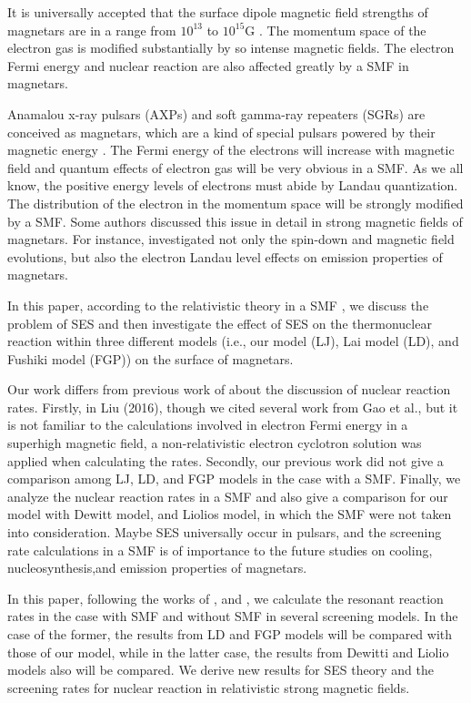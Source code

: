 \documentclass[manuscript]{aastex}
\begin{document}
It is universally accepted that the surface dipole magnetic field
strengths of magnetars are in a range from $10^{13}$ to $10^{15}$G
\citep{Peng07, Gao11, Gao13, Gao15, Gao17a, Gao17b, Li16, Lai01}.
The momentum space of the electron gas is modified substantially by
so intense magnetic fields. The electron Fermi energy and nuclear
reaction are also affected greatly by a SMF in magnetars.

Anamalou x-ray pulsars (AXPs) and soft gamma-ray repeaters (SGRs)
are conceived as magnetars, which are a kind of special pulsars
powered by their magnetic energy \citep{Duncan92}. The Fermi energy
of the electrons will increase with magnetic field and quantum
effects of electron gas will be very obvious in a SMF. As we all
know, the positive energy levels of electrons must abide by Landau
quantization. The distribution of the electron in the momentum space
will be strongly modified by a SMF. Some authors discussed this
issue in detail in strong magnetic fields of magnetars. For
instance, \citet{Gao15, Gao17a, Gao17b} investigated not only the
spin-down and magnetic field evolutions, but also the electron
Landau level effects on emission properties of magnetars.

In this paper, according to the relativistic theory in a SMF
\citep{Peng07, Gao11, Gao13, Gao15, Gao17b}, we discuss the problem
of SES and then investigate the effect of SES on the thermonuclear
reaction within three different models (i.e., our model (LJ), Lai
model (LD)\citep{Lai91, Lai01}, and Fushiki model
(FGP)\citep{Fushiki89}) on the surface of magnetars.


Our work differs from previous work of \citet{Liu16} about the
discussion of nuclear reaction rates. Firstly, in Liu (2016), though
we cited several work from Gao et al., but it is not familiar to the
calculations involved in electron Fermi energy in a superhigh
magnetic field, a non-relativistic electron cyclotron solution was
applied when calculating the rates. Secondly, our previous work
\citet{Liu16} did not give a comparison among LJ, LD, and FGP models
in the case with a SMF. Finally, we analyze the nuclear reaction
rates in a SMF and also give a comparison for our model with Dewitt
model\citep{Dewitt76}, and Liolios model\citep{Liolios00}, in which
the SMF were not taken into consideration. Maybe SES universally
occur in pulsars, and the screening rate calculations in a SMF is of
importance to the future studies on cooling, nucleosynthesis,and
emission properties of magnetars.


In this paper, following the works of \citet{Peng07}, and
\citet{Gao11, Gao13, Gao15, Gao17b}, we calculate the resonant
reaction rates in the case with SMF and without SMF in several
screening models. In the case of the former, the results from LD and
FGP models will be compared with those of our model, while in the
latter case, the results from Dewitti and Liolio models also will be
compared. We derive new results for SES theory and the screening
rates for nuclear reaction in relativistic strong magnetic fields.
\end{document}
